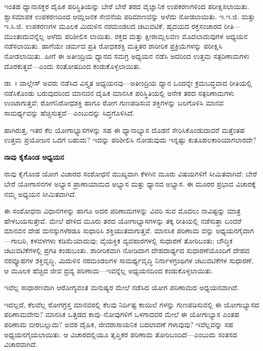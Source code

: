 ಇಂತಹ ಧ್ಯಾನಾಸಕ್ತರ ದೈಹಿಕ ಪರಿಸ್ಥಿತಿಯನ್ನು ಬೇರೆ ಬೇರೆ ತರದ ವೈಜ್ಞಾನಿಕ ಉಪಕರಣಗಳಿಂದ ಪರೀಕ್ಷಿಸಲಾಯಿತು. ಶ್ವಾಸಮಾಪಕ ಉಪಕರಣದಿಂದ ಆಮ್ಲಜನಕ ಸೇವನೆಯ ಪರಿಮಾಣವನ್ನು ಅಳೆದು ನೋಡಲಾಯಿತು. ಇ.ಇ.ಜಿ. ಮತ್ತು ಇ.ಸಿ.ಜಿ. ಉಪಕರಣಗಳ ಮೂಲಕ ಮಿದುಳಿನ ನರಮಂಡಲದ ಚಟುವಟಿಕೆ, ಹೃದಯದ ರಕ್ತಸಂಚಾರದ ರೀತಿ—ಮುಂತಾದುವನ್ನೆಲ್ಲ ಅಳೆದು ಪರಿಶೀಲಿಸ ಲಾಯಿತು. ರಕ್ತದ     ಮತ್ತು ಕ್ಷೀರಾಮ್ಲಲವಣ  ಮೊದಲಾದುವುಗಳ ಅಧ್ಯಯನ ನಡೆಸಲಾಯಿತು. ಹಾಗೆಯೇ ಚರ್ಮದ ಪ್ರತಿ ರೋಧಕಶಕ್ತಿ ಮತ್ತಿತರ ಶಾರೀರಿಕ ಪ್ರಕ್ರಿಯೆಗಳನ್ನು ಪರೀಕ್ಷಿಸಿ ನೋಡಲಾಯಿತು. ಹೀಗೆ ಈ ಅತೀಂದ್ರಿಯ ಧ್ಯಾನದ ಸಮಗ್ರ ಅಧ್ಯಯನ ನಡೆಸಿ ಅದರಿಂದ ಉತ್ತಮ ಸತ್ಪರಿಣಾಮಗಳು ದೊರಕುತ್ತವೆ—ಎಂದು ಸಂತೋಷದಿಂದ ಕಂಡುಕೊಳ್ಳಲಾಯಿತು.

ಡಾ~। ವಾಲ್ಲೇಸ್ ಅವರು ನಡೆಸಿದ ವಿಸ್ತ್ಯತ ಅಧ್ಯಯನವು—ಅತೀಂದ್ರಿಯ ಧ್ಯಾನ ಒಂದನ್ನೇ ಕ್ರಮಬದ್ಧವಾದ ರೀತಿಯಲ್ಲಿ ನಡೆಸಿಕೊಂಡು ಬರುವುದರಿಂದ ಮಾನವನ ದೈಹಿಕ ಮಾನಸಿಕ ಪರಿಸ್ಥಿತಿಯಲ್ಲಿ ಅನೇಕ ತರದ ಸತ್ಪರಿಣಾಮಗಳು ಉಂಟಾಗುತ್ತವೆ; ರೋಗನಿರೋಧಶಕ್ತಿ ಹಾಗೂ ರೋಗ ಗುಣಪಡಿಸುವ ಶಕ್ತಿಗಳನ್ನು ಬಲಗೊಳಿಸಿ ಮಾನವ ಸಾಮರ್ಥ್ಯವನ್ನು ಹೆಚ್ಚಿಸುತ್ತದೆ—ಎಂಬುದನ್ನು ಸಿದ್ಧಗೊಳಿಸಿದೆ.

ಹಾಗಿರುತ್ತ, ಇತರ ಕೆಲ ಯೋಗಾಭ್ಯಾಸಗಳನ್ನು ಸಹ ಈ ಧ್ಯಾನಾಭ್ಯಾಸ ದೊಡನೆ ಸೇರಿಸಿಕೊಂಡುದಾದರೆ ಮತ್ತೆಂತಹ ಉತ್ತಮ ಪ್ರಯೋಜನ ಒದಗ ಬಹುದು? ಇದನ್ನು ಪರಿಶೀಲಿಸಿ ನೋಡುವುದು ಇನ್ನಷ್ಟು ಕುತೂಹಲಕಾರಿಯಾಗಲಾರದೇ?

\textbf{ನಾವು ಕೈಕೊಂಡ ಅಧ್ಯಯನ}

ನಾವು ಕೈಗೊಂಡ ಯೋಗ ವಿಚಾರದ ಸಂಶೋಧನೆ ಮುಖ್ಯವಾಗಿ ಕೆಳಗಿನ ಮೂರು ವಿಷಯಗಳಿಗೆ ಸೀಮಿತವಾಗಿದೆ:  ಬೇರೆ ಬೇರೆ ಯೋಗಾಸನಗಳ ಅಭ್ಯಾಸ  ಪ್ರಾಣಾಯಾಮದ ಅಭ್ಯಾಸ ಮತ್ತು  ಧ್ಯಾನದ ಅಭ್ಯಾಸ. ಈ ಮೂರರ ಪ್ರಭಾವ ವಿಚಾರಕ್ಕೆ ನಮ್ಮ ಅಧ್ಯಯನ ಸೀಮಿತವಾಗಿದೆ.

ಈ ಸಂಶೋಧನಾ ವಿಧಾನಗಳನ್ನು ಹಾಗೂ ಅದರ ಪರಿಣಾಮಗಳನ್ನು ವಿವರಿ ಸುವ ಮೊದಲು ನಾವಿಷ್ಟನ್ನು ಮಾತ್ರ ಹೇಳಬಯಸುತ್ತೇವೆ. ಮೇಲೆ ಹೇಳಿದ ಮೂರು ತರದ ಯೋಗಾಭ್ಯಾಸಗಳನ್ನು ತಕ್ಕ ರೀತಿಯಲ್ಲಿ ನಡೆಸುತ್ತಾ ಬಂದರೆ ಮಾನವನ ದೇಹ ಮನಸ್ಸುಗಳೆರಡೂ ಸುಧಾರಿಸಿ ಶಕ್ತಿಯುತವಾಗುತ್ತವೆ. ಮಾನಸಿಕ ಪರಿಣಾಮ ವನ್ನು ಅಧ್ಯಯನಗೈದಾಗ—ಗಾಬರಿ, ಕಳವಳಗಳು ಕಡಿಮೆಯಾದುವು; ವೈಯಕ್ತಿಕ ವ್ಯವಹಾರಗಳಲ್ಲಿ ಸುಧಾರಣೆ ತೋರಿಬಂತು; ಬೌದ್ಧಿಕ ಚಟುವಟಿಕೆಗಳಲ್ಲಿ ಪ್ರಗತಿ ಕಂಡುಬಂತು. ಶಾರೀರಿಕವಾಗಿ ನೋಡಿದಾಗ ದೇಹದಾರ್ಢ್ಯದ ಸುಧಾರಣೆಯೊಂದಿಗೆ ದೇಹದ ನರವ್ಯೂಹಗಳ ಶಕ್ತಿವೃದ್ಧಿ, ಮಿದುಳಿನ ನರಮಂಡಲಗಳ ಸಾಮರ್ಥ್ಯವೃದ್ಧಿ ನಿರ್ನಾಳಗ್ರಂಥಿಗಳ ಚಟುವಟಿಕೆಗಳ ಸುಧಾರಣೆ, ಆ ಮೂಲಕ ಹೆಚ್ಚಿದ ಜೀವ ದ್ರವ್ಯ ಪರಿಣಾಮ—ಇವನ್ನೆಲ್ಲ ಅಧ್ಯಯನದಿಂದ ಕಂಡುಕೊಳ್ಳಲಾಯಿತು.

ಇವೆಲ್ಲ ಸಾಧಾರಣವಾಗಿ ಆರೋಗ್ಯವಂತ ಮನುಷ್ಯರ ಮೇಲೆ ನಡೆಸಿದ ಯೋಗ ಪರಿಣಾಮದ ಅಧ್ಯಯನವಾಗಿದೆ.

ಇದಲ್ಲದೆ, ಕೆಲವೆಲ್ಲ ರೋಗಗ್ರಸ್ತ ಮಾನವರಲ್ಲಿ ಕೆಲವು ನಿರ್ದಿಷ್ಟ ಕಾಯಿಲೆ ಗಳನ್ನು ಗುಣಪಡಿಸುವಲ್ಲಿ ಈ ಯೋಗಾಭ್ಯಾಸದ ಪರಿಣಾಮವೇನು? ಮಾನಸಿಕ ಒತ್ತಡದ ಕಾವು–ನೋವುಗಳಿಗೆ ಒಳಗಾದವರ ಮೇಲೆ ಈ ಯೋಗಾಭ್ಯಾಸ ಎಂತಹ ಪರಿಣಾಮ ಬೀರಬಲ್ಲುದು? ಅವರ ದೈಹಿಕ, ಜೀವರಾಸಾಯನಿಕ ಬದಲಾವಣೆ ಗಳಾವುವು? ಇವೆಲ್ಲವನ್ನು ಸಹ ಅಧ್ಯಯನಗೈಯಲಾಯಿತು. ಆ ವಿಚಾರದಲ್ಲಿಯೂ ತೃಪ್ತಿಕರ ಪರಿಣಾಮ ತೋರಿಬಂದಿದೆ—ಎಂಬುದು ಸಂತಸದ ವಿಚಾರವಾಗಿದೆ.

